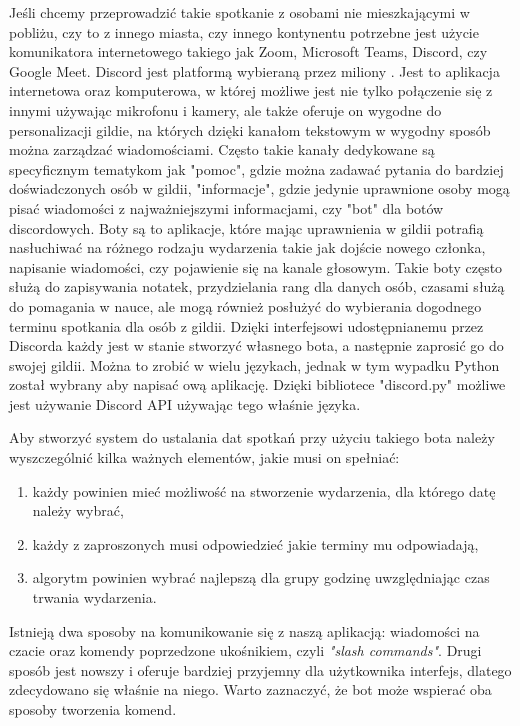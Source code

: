 \documentclass[12pt,a4paper]{article}
\begin{document}
Jeśli chcemy przeprowadzić takie spotkanie z osobami nie mieszkającymi w pobliżu, czy to z innego miasta, czy innego kontynentu potrzebne jest użycie komunikatora internetowego takiego jak Zoom, Microsoft Teams, Discord, czy Google Meet. Discord jest platformą wybieraną przez miliony \cite{DiscordPopularity}. Jest to aplikacja internetowa oraz komputerowa, w której możliwe jest nie tylko połączenie się z innymi używając mikrofonu i kamery, ale także oferuje on wygodne do personalizacji gildie, na których dzięki kanałom tekstowym w wygodny sposób można zarządzać wiadomościami. Często takie kanały dedykowane są specyficznym tematykom jak "pomoc", gdzie można zadawać pytania do bardziej doświadczonych osób w gildii, "informacje", gdzie jedynie uprawnione osoby mogą pisać wiadomości z najważniejszymi informacjami, czy "bot" dla botów discordowych. Boty są to aplikacje, które mając uprawnienia w gildii potrafią nasłuchiwać na różnego rodzaju wydarzenia takie jak dojście nowego członka, napisanie wiadomości, czy pojawienie się na kanale głosowym. Takie boty często służą do zapisywania notatek, przydzielania rang dla danych osób, czasami służą do pomagania w nauce, ale mogą również posłużyć do wybierania dogodnego terminu spotkania dla osób z gildii. Dzięki interfejsowi udostępnianemu przez Discorda każdy jest w stanie stworzyć własnego bota, a następnie zaprosić go do swojej gildii. Można to zrobić w wielu językach, jednak w tym wypadku Python został wybrany aby napisać ową aplikację. Dzięki bibliotece "discord.py" możliwe jest używanie Discord API używając tego właśnie języka.

Aby stworzyć system do ustalania dat spotkań przy użyciu takiego bota należy wyszczególnić kilka ważnych elementów, jakie musi on spełniać:
\begin{enumerate}
    \item każdy powinien mieć możliwość na stworzenie wydarzenia, dla którego datę należy wybrać,
    \item każdy z zaproszonych musi odpowiedzieć jakie terminy mu odpowiadają,
    \item algorytm powinien wybrać najlepszą dla grupy godzinę uwzględniając czas trwania wydarzenia.
\end{enumerate}

Istnieją dwa sposoby na komunikowanie się z naszą aplikacją: wiadomości na czacie oraz komendy poprzedzone ukośnikiem, czyli \textit{"slash commands"}. Drugi sposób jest nowszy i oferuje bardziej przyjemny dla użytkownika interfejs, dlatego zdecydowano się właśnie na niego. Warto zaznaczyć, że bot może wspierać oba sposoby tworzenia komend.
\end{document}
